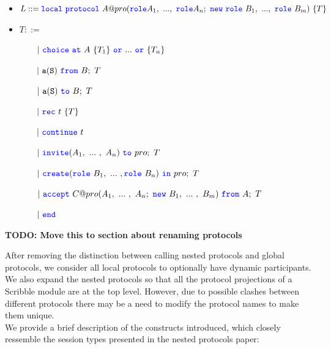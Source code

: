 \documentclass[12pt,twoside]{report}
\begin{document}
\begin{itemize}
    \item $L ::=\scrlocal\ \protocol\ A@pro(\role A_1,\ ...,\ \role A_n;\ \scrnew\ \role\ B_1,\ ...,\ \role\ B_m)\ \{T\}$
    \item $T ::= $
    
    $\quad\quad|\ \choice\ \at\ A\ \{T_1\}\ \scror\ ...\ \scror\ \{T_n\}$

    $\quad\quad|\ \scrmessage{a}{S}\ \from\ B;\ T$

    $\quad\quad|\ \scrmessage{a}{S}\ \scrto\ B;\ T$
    
    $\quad\quad|\ {\color{blue}\mathtt{rec}}\ t\ \{T\}$
    
    $\quad\quad|\ {\color{blue}\mathtt{continue}}\ t$
    
    $\quad\quad|\ \invite(A_1,\ ...\ ,\ A_n)\ \scrto\ pro;\ T$
    
    $\quad\quad|\ \create(\role\ B_1,\ ...\ ,\role\ B_n)\ \scrin\ pro;\ T$

    $\quad\quad|\ \accept\ C@pro(A_1,\ ...\ ,\ A_n;\ \scrnew\ B_1,\ ...\ ,\ B_m)\ \from\ A;\ T$

    $\quad\quad|\ {\color{blue}\mathtt{end}}$
\end{itemize}

\textbf{TODO: Move this to section about renaming protocols}


After removing the distinction between calling nested protocols and global protocols, we consider all local protocols to optionally have dynamic participants. We also expand the nested protocols so that all the protocol projections of a Scribble module are at the top level. However, due to possible clashes between different protocols there may be a need to modify the protocol names to make them unique.\\

We provide a brief description of the constructs introduced, which closely ressemble the session types presented in the nested protocols paper\cite{nestedprotocols}:
\end{document}
